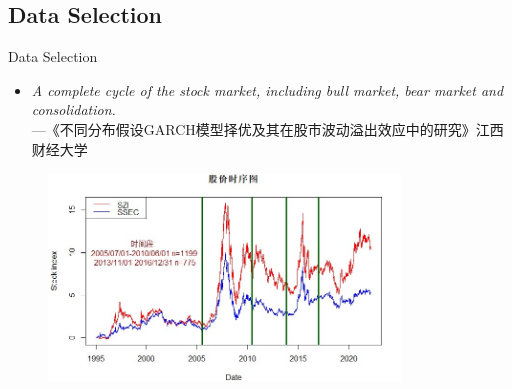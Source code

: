\documentclass{beamer}
\begin{document}
\subsection{Data Selection}
\begin{frame}{Data Selection}
  \begin{itemize}
    \item \emph{A complete cycle of the stock market, including bull market, bear market and consolidation.}\\
    \small{---《不同分布假设GARCH模型择优及其在股市波动溢出效应中的研究》江西财经大学}  
  \end{itemize}
  
  \begin{figure}[htp]
    \centering
    \includegraphics[height = 5.5cm]{fig/Time series w duration.jpg}
    \label{fig:Time slot selection plot}  
  \end{figure}
\end{frame}
\end{document}

